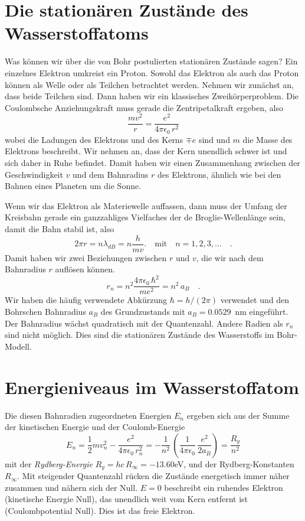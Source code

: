 \section{Die stationären Zustände des Wasserstoffatoms}

Was können wir über die von Bohr postulierten stationären Zustände sagen? Ein einzelnes Elektron umkreist ein Proton. Sowohl das Elektron als auch das Proton können als Welle oder als Teilchen betrachtet werden. Nehmen wir zunächst an, dass beide Teilchen sind. Dann haben wir ein klassisches Zweikörperproblem. Die Coulombsche Anziehungskraft muss gerade die Zentripetalkraft ergeben, also
\begin{equation}
    \frac{m v^2}{r} = \frac{e^2}{4 \pi \epsilon_0 \, r^2}
\end{equation}
wobei die Ladungen des Elektrons und des Kerns $\mp e$ sind und $m$ die Masse des Elektrons beschreibt. Wir nehmen an, dass der Kern unendlich schwer ist und sich daher in Ruhe befindet. Damit haben wir einen Zusammenhang zwischen der Geschwindigkeit $v$ und dem Bahnradius $r$ des Elektrons, ähnlich wie bei den Bahnen eines Planeten um die Sonne.

Wenn wir das Elektron als Materiewelle auffassen, dann muss der Umfang der Kreisbahn gerade ein ganzzahliges Vielfaches der de Broglie-Wellenlänge sein, damit die Bahn stabil ist, also
\begin{equation}
    2 \pi r = n \lambda_{dB} = n \frac{h}{m v}. \quad \text{mit} \quad n = 1, 2, 3, \dots \quad .
\end{equation}
Damit haben wir zwei Beziehungen zwischen $r$ und $v$, die wir nach dem Bahnradius $r$ auflösen können.
\begin{equation}
    r_n = n^2 \frac{4 \pi \epsilon_0 \, \hbar^2}{m e^2} = n^2 \, a_B \quad .
\end{equation}
Wir haben die häufig verwendete Abkürzung $\hbar = h / (2\pi)$ verwendet und den Bohrschen Bahnradius $a_B$ des Grundzustands mit $a_B = 0.0529$~nm eingeführt. Der Bahnradius wächst quadratisch mit der Quantenzahl. Andere Radien als $r_n$ sind nicht möglich. Dies sind die stationären Zustände des Wasserstoffs im Bohr-Modell.

\section{Energieniveaus im Wasserstoffatom}

Die diesen Bahnradien zugeordneten Energien $E_n$ ergeben sich aus der Summe der kinetischen Energie und der Coulomb-Energie
\begin{equation}
    E_n = \frac{1}{2} m v_n^2 - \frac{e^2}{4 \pi \epsilon_0 \, r_n^2}
    = - \frac{1}{n^2} \, \left( \frac{1}{4 \pi \epsilon_0}  \, \frac{e^2}{2 a_B} \right) 
    =  \frac{R_y}{n^2}  
\end{equation}
mit der \emph{Rydberg-Energie} $R_y = h c \, R_\infty =  - 13.60$eV, und der Rydberg-Konstanten $R_\infty$. Mit steigender Quantenzahl rücken die Zustände energetisch immer näher zusammen und nähern sich der Null. $E=0$ beschreibt ein ruhendes Elektron (kinetische Energie Null), das unendlich weit vom Kern entfernt ist (Coulombpotential Null). Dies ist das freie Elektron.

